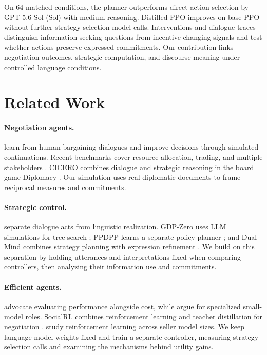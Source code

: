 \documentclass[11pt]{article}
\begin{document}
On 64 matched conditions, the planner outperforms direct action selection by GPT-5.6 Sol (Sol) with medium reasoning. Distilled PPO improves on base PPO without further strategy-selection model calls. Interventions and dialogue traces distinguish information-seeking questions from incentive-changing signals and test whether actions preserve expressed commitments. Our contribution links negotiation outcomes, strategic computation, and discourse meaning under controlled language conditions.

\section{Related Work}
\paragraph{Negotiation agents.}
\citet{lewis-etal-2017-deal} learn from human bargaining dialogues and improve decisions through simulated continuations. Recent benchmarks cover resource allocation, trading, and multiple stakeholders \citep{bianchi2024negotiationarena,abdelnabi2024stakeholders}. CICERO combines dialogue and strategic reasoning in the board game Diplomacy \citep{fair2022cicero}. Our simulation uses real diplomatic documents to frame reciprocal measures and commitments.

\paragraph{Strategic control.}
\citet{he-etal-2018-decoupling} separate dialogue acts from linguistic realization. GDP-Zero uses LLM simulations for tree search \citep{yu-etal-2023-prompt}; PPDPP learns a separate policy planner \citep{deng2024ppdpp}; and Dual-Mind combines strategy planning with expression refinement \citep{liu-etal-2025-dual}. We build on this separation by holding utterances and interpretations fixed when comparing controllers, then analyzing their information use and commitments.

\paragraph{Efficient agents.}
\citet{kapoor2024agents} advocate evaluating performance alongside cost, while \citet{belcak2025small} argue for specialized small-model roles. SocialRL combines reinforcement learning and teacher distillation for negotiation \citep{hua2026socialrl}. \citet{tabacof2026negotiate} study reinforcement learning across seller model sizes. We keep language model weights fixed and train a separate controller, measuring strategy-selection calls and examining the mechanisms behind utility gains.









\clearpage


\clearpage
\appendix


\end{document}
